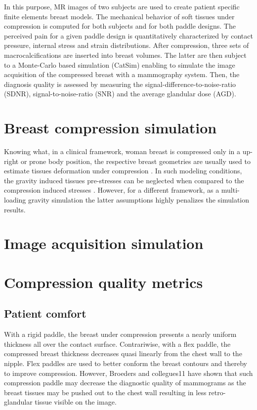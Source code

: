 In this purpose, MR images of two subjects are used to create patient specific finite elements breast models. The mechanical behavior of soft tissues under compression is computed for both subjects and for both paddle designs. The perceived pain for a given paddle design is quantitatively characterized by contact pressure, internal stress and strain distributions. After compression, three sets of macrocalcifications are inserted into breast volumes. The latter are then subject to a Monte-Carlo based simulation (CatSim) enabling to simulate the image acquisition of the compressed breast with a mammography system. Then, the diagnosis quality is assessed by measuring the signal-difference-to-noise-ratio (SDNR), signal-to-noise-ratio (SNR) and the average glandular dose (AGD). 

\clearpage

\section{Breast compression simulation}
Knowing what, in a clinical framework, woman breast is compressed only in a up-right or prone body position, the respective breast geometries are usually used to estimate tissues deformation under compression . In such modeling conditions, the gravity induced tissues pre-stresses can be neglected when compared to the compression induced stresses \citep{han_development_2012, ruiter_model_based_2006, sturgeon_finite_element_2016}. However, for a different framework, as a multi-loading gravity simulation the latter assumptions highly penalizes the simulation results.
\section{Image acquisition simulation }
\section{Compression quality metrics}\label{section:compressionqualitymetrics}
\subsection{Patient comfort}
With a rigid paddle, the breast under compression presents a nearly uniform thickness all over the contact surface. Contrariwise, with a flex paddle, the compressed breast thickness decreases quasi linearly from the chest wall to the nipple. Flex paddles are used to better conform the breast contours and thereby to improve compression. However, Broeders and collegues11 have shown that such compression paddle may decrease the diagnostic quality of mammograms as the breast tissues may be pushed out to the chest wall resulting in less retro-glandular tissue visible on the image. 


